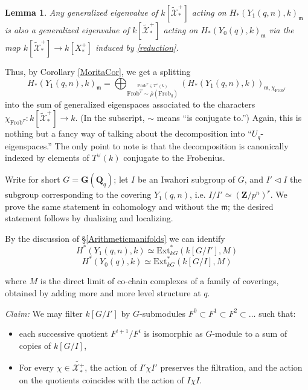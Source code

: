 \documentclass[10pt]{amsart}
\newif\iflongproof
\newcommand{\Z}{\mathbf{Z}}
\newcommand{\Ext}{\mathrm{Ext}}
\newcommand{\rhobar}{\overline{\rho}}
\newcommand{\Frob}{\mathrm{Frob}}
\newcommand{\Q}{\mathbf{Q}}
\newcommand{\G}{\mathbf{G}}
\newtheorem{lemma}[subsection]{Lemma}
\theoremstyle{remark}
\begin{document}
 
\begin{lemma}
Any generalized eigenvalue of $k[\widetilde{\mathcal{X}}_*^+]$
acting on $H_*(Y_1(q, n),k)_{\mathfrak{m}} $ is also
a generalized eigenvalue of $k[\widetilde{\mathcal{X}}_*^+] $ acting on
$H_*(Y_0(q),k)_{\mathfrak{m}}$ via the map $k[\widetilde{\mathcal{X}}_*^+]  \rightarrow k[X_*^+]$ induced by \eqref{reduction}. 
 \end{lemma}
 
 
 Thus, by  Corollary
\ref{MoritaCor}, we get a splitting  
 \begin{equation} \label{bigsplit} H_*(Y_1(q, n),k)_{\mathfrak{m}} = \bigoplus_{\stackrel{ \Frob^T \in T^{\vee}(k)}{\Frob^T \sim \rhobar(\Frob_q)}} \left( H_* (Y_1(q,n), k) \right)_{\mathfrak{m},\chi_{\Frob^T}}\end{equation} 
   into   the  sum of generalized eigenspaces associated to the characters $\chi_{\Frob^T}: k[\widetilde{\mathcal{X}}_*^+] \rightarrow k$. (In the subscript, $\sim$ means ``is conjugate to.'') 
 Again, this is nothing but a fancy way of talking about the decomposition into ``$U_{q}$-eigenspaces.''  The only point to note is that the decomposition is
canonically  indexed by elements of $T^{\vee}(k)$ conjugate to the Frobenius. 

 \proof   
  \iflongproof Write for short $G = \G(\Q_{q})$; let $I$ be an Iwahori subgroup of $G$, and $I' \vartriangleleft I$
 the subgroup corresponding to the covering $Y_1(q, n)$, i.e. $I/I' \simeq (\Z/p^n)^r$. 
 We prove the same statement in cohomology and without the $\mathfrak{m}$; the desired
 statement follows by dualizing and localizing.
  
 By the discussion of \S \ref{Arithmeticmanifolds} we can identify
 $$H^*(Y_1(q, n), k) \simeq \Ext^*_{kG} (k[G/I'], M)$$
 $$ H^*(Y_0(q), k) \simeq \Ext^*_{kG}(k[G/I], M)$$
 
 where $M$ is the direct limit of co-chain complexes of  a family of coverings, obtained
 by adding more and more level structure at $q$.  
 
 {\em Claim:} We may filter $k[G/I']$ by $G$-submodules 
 $F^0 \subset F^1 \subset F^2 \subset \dots $
such that: 
 \begin{itemize}
 \item[(i)] each successive quotient $F^{i+1}/F^i$ is isomorphic as $G$-module to a sum of copies of $k[G/I]$,
 \item[(ii)] For every $\chi \in \widetilde{\mathcal{X}_*^+}$,  the action of $I' \chi I'$ preserves the filtration, and  the action on the quotients coincides with the action of $I \chi I$. 
 \end{itemize}
 
\end{document}
